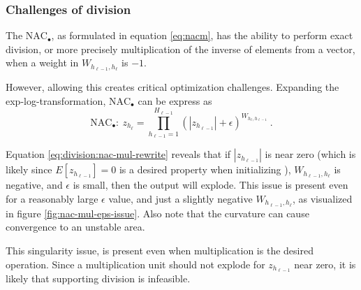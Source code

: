 \subsubsection{Challenges of division} \label{sssec:nac-mul}

The $\text{NAC}_{\bullet}$, as formulated in equation \ref{eq:nacm}, has the ability to perform exact division, or more precisely multiplication of the inverse of elements from a vector, when a weight in $W_{h_{\ell-1},h_\ell}$ is $-1$.

However, allowing this creates critical optimization challenges. Expanding the exp-log-transformation, $\text{NAC}_{\bullet}$ can be express as
\begin{equation}
\textrm{NAC}_\bullet:\ z_{h_\ell} = \prod_{h_{\ell-1}=1}^{H_{\ell-1}} (|z_{h_{\ell-1}}| + \epsilon)^{W_{h_{\ell}, h_{\ell-1}}}\ .
\label{eq:division:nac-mul-rewrite}
\end{equation}

Equation \eqref{eq:division:nac-mul-rewrite} reveals that if $|z_{h_{\ell-1}}|$ is near zero (which is likely since $E[z_{h_{\ell-1}}] = 0$ is a desired property when initializing \cite{glorot-initialization}), $W_{h_{\ell-1},h_\ell}$ is negative, and $\epsilon$ is small, then the output will explode. This issue is present even for a reasonably large $\epsilon$ value, and just a slightly negative $W_{h_{\ell-1},h_\ell}$, as visualized in figure \ref{fig:nac-mul-eps-issue}. Also note that the curvature can cause convergence to an unstable area.

This singularity issue, is present even when multiplication is the desired operation. Since a multiplication unit should not explode for $z_{h_{\ell-1}}$ near zero, it is likely that  supporting division is infeasible.


